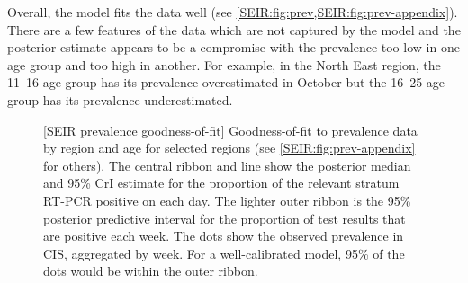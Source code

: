 \documentclass[thesis.tex]{subfiles}
\begin{document}
Overall, the model fits the data well (see \cref{SEIR:fig:prev,SEIR:fig:prev-appendix}).
There are a few features of the data which are not captured by the model and the posterior estimate appears to be a compromise with the prevalence too low in one age group and too high in another.
For example, in the North East region, the 11--16 age group has its prevalence overestimated in October but the 16--25 age group has its prevalence underestimated.
\begin{figure}
    \captionsetup{width=0.8\paperwidth}
    [SEIR prevalence goodness-of-fit]{%
        Goodness-of-fit to prevalence data by region and age for selected regions (see \cref{SEIR:fig:prev-appendix} for others).
        The central ribbon and line show the posterior median and 95\% CrI estimate for the proportion of the relevant stratum RT-PCR positive on each day.
        The lighter outer ribbon is the 95\% posterior predictive interval for the proportion of test results that are positive each week.
        The dots show the observed prevalence in CIS, aggregated by week.
        For a well-calibrated model, 95\% of the dots would be within the outer ribbon.
    }
    \label{SEIR:fig:prev}
\end{figure}
\end{document}
